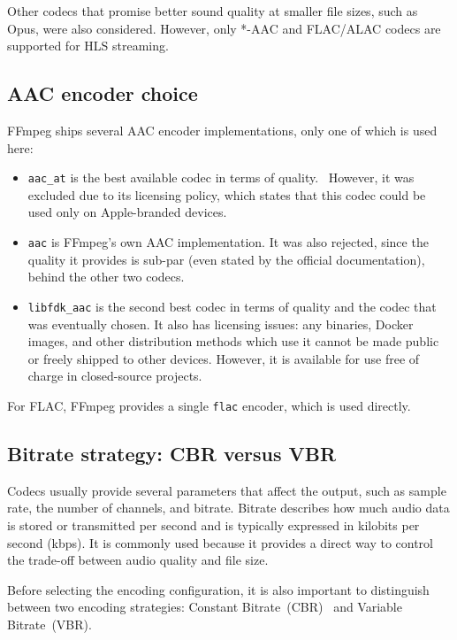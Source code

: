 \documentclass[a4paper,11pt]{article}
\begin{document}
Other codecs that promise better sound quality at smaller file sizes,
such as Opus, were also considered. However, only *-AAC and FLAC/ALAC
codecs are supported for HLS
streaming.~\parencite{apple_hls_specs_audio}

\subsection{AAC encoder choice}
FFmpeg ships several AAC encoder implementations, only one of which is
used here:
\begin{itemize}
    \item \texttt{aac\_at} is the best available codec in terms of
    quality.~\parencite{aac_codec_cmp_1,aac_codec_cmp_2,aac_codec_cmp_3}
    However, it was excluded due to its licensing policy, which states
    that this codec could be used only on Apple-branded
    devices.~\parencite{aac_at_licensing,ffmpeg_aac}
    \item \texttt{aac} is FFmpeg's own AAC implementation. It was also
    rejected, since the quality it provides is sub-par (even stated by
    the official documentation), behind the other two
    codecs.~\parencite{aac_codec_cmp_1,aac_codec_cmp_2,aac_codec_cmp_3,ffmpeg_aac}
    \item \texttt{libfdk\_aac} is the second best codec in terms of
    quality and the codec that was eventually chosen. It also has
    licensing issues: any binaries, Docker images, and other
    distribution methods which use it cannot be made public or freely
    shipped to other devices. However, it is available for use free of
    charge in closed-source
    projects.~\parencite{vialicensing_aac, spdx_aac, ffmpeg_aac}
\end{itemize}
For FLAC, FFmpeg provides a single \texttt{flac} encoder, which is used
directly.

\subsection{Bitrate strategy: CBR versus VBR}
Codecs usually provide several parameters that affect the output, such
as sample rate, the number of channels, and bitrate. Bitrate describes
how much audio data is stored or transmitted per second and is
typically expressed in kilobits per second (kbps). It is commonly used
because it provides a direct way to control the trade-off between
audio quality and file size.

Before selecting the encoding configuration, it is also important to
distinguish between two encoding strategies: Constant
Bitrate~(CBR)~\parencite{cbr} and Variable
Bitrate~(VBR).~\parencite{vbr}
\end{document}

